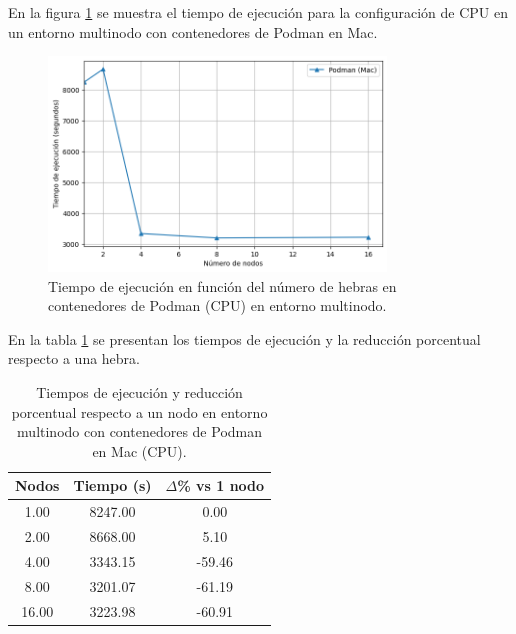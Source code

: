 En la figura \ref{fig:multi-node_mac_podman_time} se muestra el tiempo de ejecución para la configuración de CPU en un entorno multinodo con contenedores de Podman en Mac.

\begin{figure}[H]
    \centering
    \includegraphics[width=0.8\textwidth]{imagenes/cap5/multi-node_mac_podman_time.png}
    \caption{Tiempo de ejecución en función del número de hebras en contenedores de Podman (CPU) en entorno multinodo.}
    \label{fig:multi-node_mac_podman_time}
\end{figure}

En la tabla \ref{tab:multi-node_mac_podman} se presentan los tiempos de ejecución y la reducción porcentual respecto a una hebra.

\begin{table}[ht]
    \centering
    \begin{tabular}{|c|c|c|}
        \hline
        \textbf{Nodos} & \textbf{Tiempo (s)} & \textbf{$\Delta$\% vs 1 nodo} \\
        \hline
        1.00           & 8247.00             & 0.00                          \\
        2.00           & 8668.00             & 5.10                          \\
        4.00           & 3343.15             & -59.46                        \\
        8.00           & 3201.07             & -61.19                        \\
        16.00          & 3223.98             & -60.91                        \\
        \hline
    \end{tabular}
    \caption{Tiempos de ejecución y reducción porcentual respecto a un nodo en entorno multinodo con contenedores de Podman en Mac (CPU).}
    \label{tab:multi-node_mac_podman}
\end{table}

